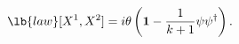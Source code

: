 \begin{equation}
\lb{law}
[X^1,X^2]=i\theta
\left(
{{\bf 1}}- \frac{1}{k+1}\psi \psi^{\dag}
\right) .
\end{equation}

